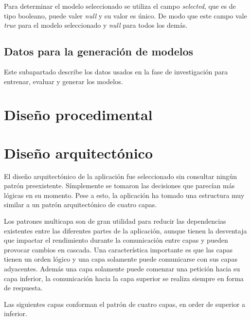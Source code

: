 Para determinar el modelo seleccionado se utiliza el campo \textit{selected},
que es de tipo booleano, puede valer \textit{null} y su valor es único. De modo
que este campo vale \textit{true} para el modelo seleccionado y \textit{null}
para todos los demás.

\subsection{Datos para la generación de modelos}

Este subapartado describe los datos usados en la fase de investigación para
entrenar, evaluar y generar los modelos.

\section{Diseño procedimental}


\section{Diseño arquitectónico}

El diseño arquitectónico de la aplicación fue seleccionado sin consultar ningún
patrón preexistente. Símplemente se tomaron las decisiones que parecían más
lógicas en su momento. Pese a esto, la aplicación ha tomado una estructura muy
similar a un patrón arquitectónico de cuatro capas.

Los patrones multicapa son de gran utilidad para reducir las dependencias
existentes entre las diferentes partes de la aplicación, aunque tienen la
desventaja que impactar el rendimiento durante la comunicación entre capas y
pueden provocar cambios en cascada. Una característica importante es que las
capas tienen un orden lógico y una capa solamente puede comunicarse con sus
capas adyacentes. Además una capa solamente puede comenzar una petición hacia su
capa inferior, la comunicación hacia la capa superior se realiza siempre en
forma de respuesta.

Las siguientes capas conforman el patrón de cuatro capas, en order de superior a
inferior.


